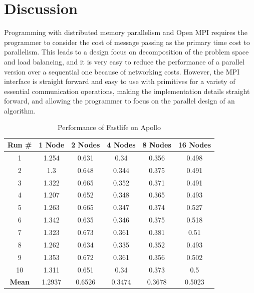 \documentclass[11pt,letterpaper]{article}
\begin{document}
\section*{Discussion}

Programming with distributed memory parallelism and Open MPI requires the programmer to consider the cost of message passing as the primary time cost to parallelism. This leads to a design focus on decomposition of the problem space and load balancing, and it is very easy to reduce the performance of a parallel version over a sequential one because of networking costs. However, the MPI interface is straight forward and easy to use with primitives for a variety of essential communication operations, making the implementation details straight forward, and allowing the programmer to focus on the parallel design of an algorithm.




\newpage
\appendix

\begin{table}[t!]
    \renewcommand{\arraystretch}{1.5}
    \centering
\begin{tabular}{ | c || c | c | c | c | c | }
	\hline
	\textbf{Run #} & \textbf{1 Node} & \textbf{2 Nodes} & \textbf{4 Nodes} &	 \textbf{8 Nodes} & \textbf{16 Nodes} \\
	\hline
	1 & 1.254 & 0.631 & 0.34 & 0.356 & 0.498 \\
	2 & 1.3 & 0.648 & 0.344 & 0.375 & 0.491 \\
	3 & 1.322 & 0.665 & 0.352 & 0.371 & 0.491 \\
	4 & 1.207 & 0.652 & 0.348 & 0.365 & 0.493 \\
	5 & 1.263 & 0.665 & 0.347 & 0.374 & 0.527 \\
	6 & 1.342 & 0.635 & 0.346 & 0.375 & 0.518 \\
	7 & 1.323 & 0.673 & 0.361 & 0.381 & 0.51 \\
	8 & 1.262 & 0.634 & 0.335 & 0.352 & 0.493 \\
	9 & 1.353 & 0.672 & 0.361 & 0.356 & 0.502 \\
	10 & 1.311 & 0.651 & 0.34 & 0.373 & 0.5 \\
	\hline
	\textbf{Mean} & 1.2937 & 0.6526 & 0.3474 & 0.3678 & 0.5023 \\
	\hline
\end{tabular}
	\caption{Performance of Fastlife on Apollo}
	\label{table:apollo-performance}
\end{table}
\end{document}
